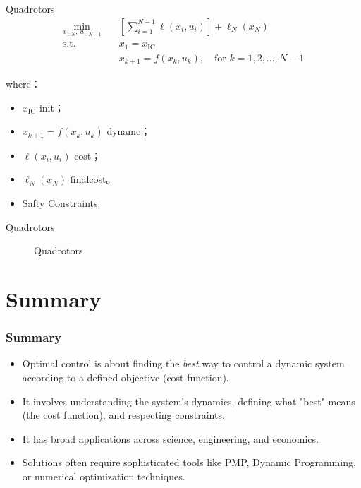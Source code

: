 \documentclass{beamer}
\begin{document}
\begin{frame}{Quadrotors}
\[
\begin{aligned}
\min_{x_{1:N},\, u_{1:N-1}} \quad & \left[ \sum_{i=1}^{N-1} \ell(x_i, u_i) \right] + \ell_N(x_N) \\
\text{s.t.} \quad & x_1 = x_{\mathrm{IC}} \\
& x_{k+1} = f(x_k, u_k), \quad \text{for } k = 1,2,\ldots,N-1
\end{aligned}
\]

\vspace{0.5em}

where：
\begin{itemize}
    \item $x_{\mathrm{IC}}$ init；
    \item $x_{k+1} = f(x_k, u_k)$ dynamc；
    \item $\ell(x_i,u_i)$ cost；
    \item $\ell_N(x_N)$ finalcost。
    \item Safty Constraints
\end{itemize}

\vspace{0.5em}

\end{frame}

\begin{frame}{Quadrotors}
    \begin{figure}
        \centering
        \caption{Quadrotors}
    \end{figure}
\end{frame}

\section{Summary}

\begin{frame}
\frametitle{Summary}
    \begin{itemize}
        \item Optimal control is about finding the \emph{best} way to control a dynamic system according to a defined objective (cost function).
        \item It involves understanding the system's dynamics, defining what "best" means (the cost function), and respecting constraints.
        \item It has broad applications across science, engineering, and economics.
        \item Solutions often require sophisticated tools like PMP, Dynamic Programming, or numerical optimization techniques.
    \end{itemize}
\end{frame}
\end{document}
